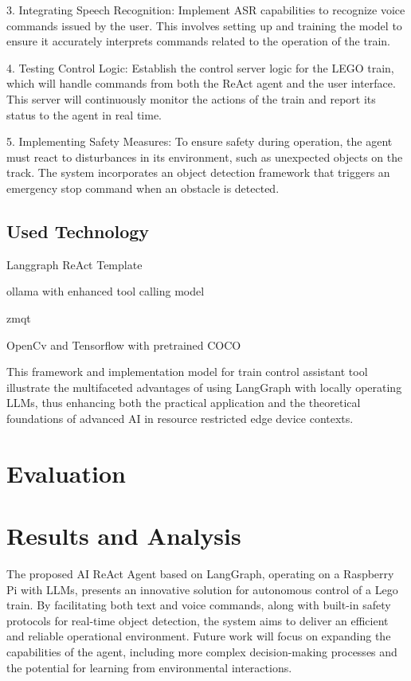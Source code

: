 3. Integrating Speech Recognition: Implement ASR capabilities to recognize voice commands issued by the user. This involves setting up and training the model to ensure it accurately interprets commands related to the operation of the train.

4. Testing Control Logic: Establish the control server logic for the LEGO train, which will handle commands from both the ReAct agent and the user interface. This server will continuously monitor the actions of the train and report its status to the agent in real time.

5. Implementing Safety Measures: To ensure safety during operation, the agent must react to disturbances in its environment, such as unexpected objects on the track. The system incorporates an object detection framework that triggers an emergency stop command when an obstacle is detected.


\subsection{Used Technology}

Langgraph ReAct Template

ollama with enhanced tool calling model

zmqt

OpenCv and Tensorflow with pretrained COCO



This framework and implementation model for train control assistant tool illustrate the multifaceted advantages of using LangGraph with locally operating LLMs, thus enhancing both the practical application and the theoretical foundations of advanced AI in resource restricted edge device contexts.

%
%
\section{Evaluation}
\label{sec:system_design:evaluation}


%
%
\section{Results and Analysis}
\label{sec:system_design:results}

The proposed AI ReAct Agent based on LangGraph, operating on a Raspberry Pi with LLMs, presents an innovative solution for autonomous control of a Lego train. By facilitating both text and voice commands, along with built-in safety protocols for real-time object detection, the system aims to deliver an efficient and reliable operational environment. Future work will focus on expanding the capabilities of the agent, including more complex decision-making processes and the potential for learning from environmental interactions.

